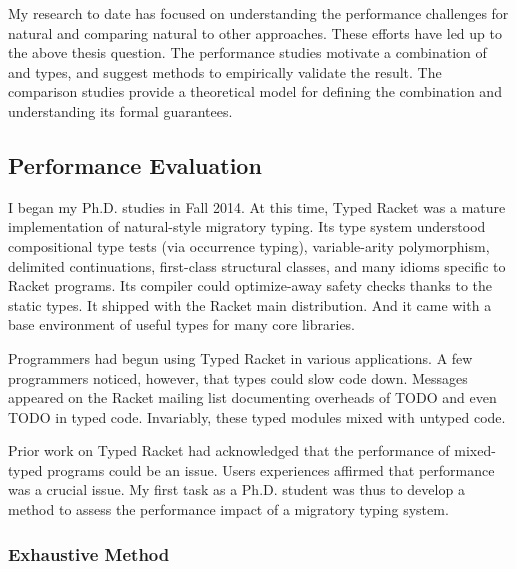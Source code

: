%
%
%
%

My research to date has focused on
 understanding the performance challenges for natural
 and comparing natural to other approaches.
These efforts have led up to the above thesis question.
The performance studies motivate a combination of \tdeep{} and \tshallow{}
 types, and suggest methods to empirically validate the result.
The comparison studies provide a theoretical model for defining the
 combination and understanding its formal guarantees.


\subsection{Performance Evaluation}

I began my Ph.D. studies in Fall 2014.
At this time, Typed Racket was a mature implementation of natural-style
 migratory typing.
Its type system understood compositional type tests (via occurrence typing),
 variable-arity polymorphism,
 delimited continuations,
 first-class structural classes,
 and many idioms specific to Racket programs.
Its compiler could optimize-away safety checks thanks to the static types.
It shipped with the Racket main distribution.
And it came with a base environment of useful types for many core
 libraries.

Programmers had begun using Typed Racket in various applications.
A few programmers noticed, however, that types could slow code down.
Messages appeared on the Racket mailing list documenting overheads
 of TODO and even TODO in typed code.
Invariably, these typed modules mixed with untyped code.

Prior work on Typed Racket had acknowledged that the performance of mixed-typed
 programs could be an issue.
Users experiences affirmed that performance was a crucial issue.
My first task as a Ph.D. student was thus to develop a method to assess the
 performance impact of a migratory typing system.


\subsubsection{Exhaustive Method}

